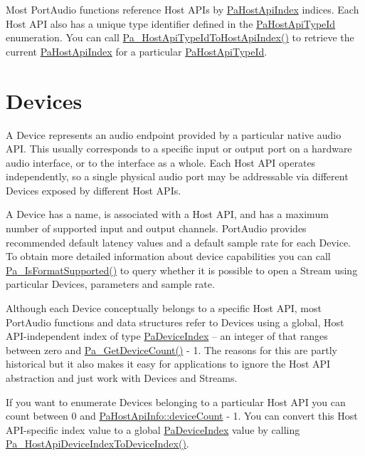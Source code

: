 Most Port\+Audio functions reference Host A\+P\+Is by \hyperlink{portaudio_8h_aeef6da084c57c70aa94be97411e19930}{Pa\+Host\+Api\+Index} indices. Each Host A\+PI also has a unique type identifier defined in the \hyperlink{portaudio_8h_ae247ec252e84112170079ece319fc42c}{Pa\+Host\+Api\+Type\+Id} enumeration. You can call \hyperlink{portaudio_8h_a081c3975126d20b4226facfb7ba0620f}{Pa\+\_\+\+Host\+Api\+Type\+Id\+To\+Host\+Api\+Index()} to retrieve the current \hyperlink{portaudio_8h_aeef6da084c57c70aa94be97411e19930}{Pa\+Host\+Api\+Index} for a particular \hyperlink{portaudio_8h_ae247ec252e84112170079ece319fc42c}{Pa\+Host\+Api\+Type\+Id}.\hypertarget{api_overview_devices}{}\section{Devices}\label{api_overview_devices}
A Device represents an audio endpoint provided by a particular native audio A\+PI. This usually corresponds to a specific input or output port on a hardware audio interface, or to the interface as a whole. Each Host A\+PI operates independently, so a single physical audio port may be addressable via different Devices exposed by different Host A\+P\+Is.

A Device has a name, is associated with a Host A\+PI, and has a maximum number of supported input and output channels. Port\+Audio provides recommended default latency values and a default sample rate for each Device. To obtain more detailed information about device capabilities you can call \hyperlink{portaudio_8h_abdb313743d6efef26cecdae787a2bd3d}{Pa\+\_\+\+Is\+Format\+Supported()} to query whether it is possible to open a Stream using particular Devices, parameters and sample rate.

Although each Device conceptually belongs to a specific Host A\+PI, most Port\+Audio functions and data structures refer to Devices using a global, Host A\+P\+I-\/independent index of type \hyperlink{portaudio_8h_ad79317e65bde63d76c4b8e711ac5a361}{Pa\+Device\+Index} -- an integer of that ranges between zero and \hyperlink{portaudio_8h_acfe4d3c5ec1a343f459981bfa2057f8d}{Pa\+\_\+\+Get\+Device\+Count()} -\/ 1. The reasons for this are partly historical but it also makes it easy for applications to ignore the Host A\+PI abstraction and just work with Devices and Streams.

If you want to enumerate Devices belonging to a particular Host A\+PI you can count between 0 and \hyperlink{struct_pa_host_api_info_a44e3adfaba0117a6780e2493468c96b1}{Pa\+Host\+Api\+Info\+::device\+Count} -\/ 1. You can convert this Host A\+P\+I-\/specific index value to a global \hyperlink{portaudio_8h_ad79317e65bde63d76c4b8e711ac5a361}{Pa\+Device\+Index} value by calling \hyperlink{portaudio_8h_a54f306b5e5258323c95a27c5722258cd}{Pa\+\_\+\+Host\+Api\+Device\+Index\+To\+Device\+Index()}.

